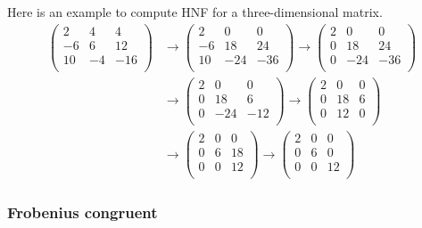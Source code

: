 Here is an example to compute HNF for a three-dimensional matrix.
\begin{align*}
  \begin{pmatrix}        2 & 4 & 4 \\        -6 & 6 & 12 \\        10 & -4 & -16 \\    \end{pmatrix}
  &\to    \begin{pmatrix}        2 & 0 & 0 \\        -6 & 18 & 24 \\        10 & -24 & -36 \\    \end{pmatrix}
  \to    \begin{pmatrix}        2 & 0 & 0 \\        0 & 18 & 24 \\        0 & -24 & -36 \\    \end{pmatrix}    \\
  &\to    \begin{pmatrix}        2 & 0 & 0 \\        0 & 18 & 6 \\        0 & -24 & -12 \\     \end{pmatrix}
  \to    \begin{pmatrix}        2 & 0 & 0 \\        0 & 18 & 6 \\        0 & 12 & 0 \\    \end{pmatrix}    \\
  &\to    \begin{pmatrix}        2 & 0 & 0 \\        0 & 6 & 18 \\        0 & 0 & 12 \\    \end{pmatrix}
  \to    \begin{pmatrix}        2 & 0 & 0 \\        0 & 6 & 0 \\        0 & 0 & 12 \\    \end{pmatrix}
\end{align*}

\subsubsection{Frobenius congruent}


